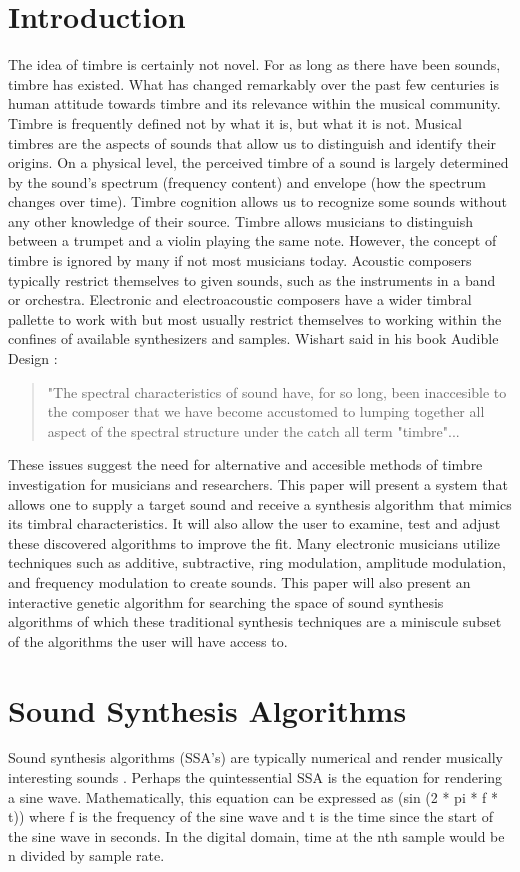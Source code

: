 \documentclass[12pt]{article}
\begin{document}
\section{Introduction}
The idea of timbre is certainly not novel. For as long as there have been sounds, timbre has existed. What has changed remarkably over the past few centuries is human attitude towards timbre and its relevance within the musical community. Timbre is frequently defined not by what it is, but what it is not.
Musical timbres are the aspects of sounds that allow us to distinguish and identify their origins. On a physical level, the perceived timbre of a sound is largely determined by the sound's spectrum (frequency content) and envelope (how the spectrum changes over time). Timbre cognition allows us to recognize some sounds without any other knowledge of their source. Timbre allows musicians to distinguish between a trumpet and a violin playing the same note. However, the concept of timbre is ignored by many if not most musicians today. Acoustic composers typically restrict themselves to given sounds, such as the instruments in a band or orchestra. Electronic and electroacoustic composers have a wider timbral pallette to work with but most usually restrict themselves to working within the confines of available synthesizers and samples. Wishart said in his book Audible Design \citep{wishart1994audible}:
\begin{quote}
"The spectral characteristics of sound have, for so long, been inaccesible to the composer that we have become accustomed to lumping together all aspect of the spectral structure under the catch all term "timbre"...
\end{quote}	 
These issues suggest the need for alternative and accesible methods of timbre investigation for musicians and researchers. This paper will present a system that allows one to supply a target sound and receive a synthesis algorithm that mimics its timbral characteristics. It will also allow the user to examine, test and adjust these discovered algorithms to improve the fit. Many electronic musicians utilize techniques such as additive, subtractive, ring modulation, amplitude modulation, and frequency modulation to create sounds. This paper will also present an interactive genetic algorithm for searching the space of sound synthesis algorithms of which these traditional synthesis techniques are a miniscule subset of the algorithms the user will have access to.

\section{Sound Synthesis Algorithms}
Sound synthesis algorithms (SSA's) are typically numerical and render musically interesting sounds \citep{tolonen1998evaluation}. Perhaps the quintessential SSA is the equation for rendering a sine wave. Mathematically, this equation can be expressed as (sin (2 * pi * f * t)) where f is the frequency of the sine wave and t is the time since the start of the sine wave in seconds. In the digital domain, time at the nth sample would be n divided by sample rate.
	
\end{document}
